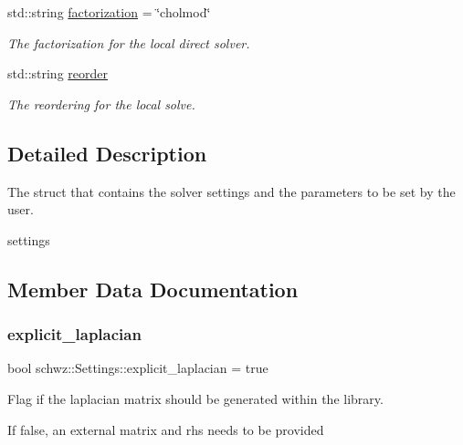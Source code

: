 \begin{DoxyCompactItemize}
\item 
\mbox{\label{structschwz_1_1Settings_a9ac5443eff787613f4f39843cbfa568d}} 
std\+::string \hyperlink{structschwz_1_1Settings_a9ac5443eff787613f4f39843cbfa568d}{factorization} = \char`\"{}cholmod\char`\"{}
\begin{DoxyCompactList}\small\item\em The factorization for the local direct solver. \end{DoxyCompactList}\item 
\mbox{\label{structschwz_1_1Settings_a429197e8093f3f87664ee6c37f91068e}} 
std\+::string \hyperlink{structschwz_1_1Settings_a429197e8093f3f87664ee6c37f91068e}{reorder}
\begin{DoxyCompactList}\small\item\em The reordering for the local solve. \end{DoxyCompactList}\end{DoxyCompactItemize}


\subsection{Detailed Description}
The struct that contains the solver settings and the parameters to be set by the user. 

settings 

\subsection{Member Data Documentation}
\mbox{\label{structschwz_1_1Settings_a2af5f07901df047e305c456b2f97e774}} 
\subsubsection{\texorpdfstring{explicit\+\_\+laplacian}{explicit\_laplacian}}
{\footnotesize\ttfamily bool schwz\+::\+Settings\+::explicit\+\_\+laplacian = true}



Flag if the laplacian matrix should be generated within the library. 

If false, an external matrix and rhs needs to be provided 

